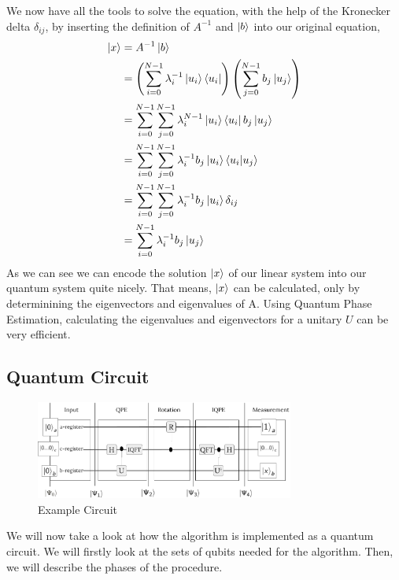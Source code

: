 We now have all the tools to solve the equation, with the help of the Kronecker delta $\delta_{ij}$, by inserting the definition of $A^{-1}$ and $\ket b$ into our original equation,
\begin{equation}
\begin{split}
\ket{x} &= A^{-1} \ket{b}\\
&=\left(\sum_{i=0}^{N-1} \lambda_i^{-1} \ket{u_i}\bra{u_i} \right) \left(\sum_{j=0}^{N-1} b_j\ket{u_j} \right) \\
&=\sum_{i=0}^{N-1} \sum_{j=0}^{N-1} \lambda_i^{N-1} \ket{u_i}\bra{u_i} b_j\ket{u_j}\\
&=\sum_{i=0}^{N-1} \sum_{j=0}^{N-1} \lambda_i^{-1} b_j\ket{u_i}\braket{u_i| u_j}\\
&=\sum_{i=0}^{N-1} \sum_{j=0}^{N-1} \lambda_i^{-1} b_j\ket{u_i}\delta_{ij}\\
&=\sum_{i=0}^{N-1} \lambda_i^{-1} b_j\ket{u_j}\\
\end{split}
\end{equation}
As we can see we can encode the solution $\ket x$ of our linear system into our quantum system quite nicely.
That means, $\ket x$ can be calculated, only by determinining the eigenvectors and eigenvalues of A. 
Using Quantum Phase Estimation, calculating the eigenvalues and eigenvectors for a unitary $U$ can be very efficient.



\subsection{Quantum Circuit}

\begin{figure}
    \centering
    \includegraphics[width=8.5cm]{img/example_circuit_cropped.png}
    \caption{Example Circuit}
    \label{ex_circ}
\end{figure}


We will now take a look at how the algorithm is implemented as a quantum circuit. 
We will firstly look at the sets of qubits needed for the algorithm. 
Then, we will describe the phases of the procedure.

